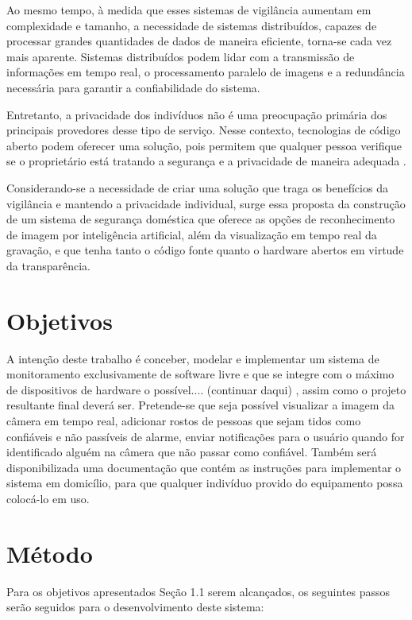 \documentclass[12pt, %
openright, 
oneside, %
a4paper,    %
brazil]{facom-ufu-abntex2}
\begin{document}
Ao mesmo tempo, à medida que esses sistemas de vigilância aumentam em
complexidade e tamanho, a necessidade de sistemas distribuídos, capazes de
processar grandes quantidades de dados de maneira eficiente, torna-se cada vez
mais aparente. Sistemas distribuídos podem lidar com a transmissão de
informações em tempo real, o processamento paralelo de imagens e a redundância
necessária para garantir a confiabilidade do sistema.

Entretanto, a privacidade dos indivíduos não é uma preocupação primária dos
principais provedores desse tipo de serviço. Nesse contexto, tecnologias de
código aberto podem oferecer uma solução, pois permitem que qualquer pessoa
verifique se o proprietário está tratando a segurança e a privacidade de
maneira adequada \cite{mardjan2016open}.

Considerando-se a necessidade de criar uma solução que traga os benefícios da
vigilância e mantendo a privacidade individual, surge essa proposta da
construção de um sistema de segurança doméstica que oferece as opções de
reconhecimento de imagem por inteligência artificial, além da visualização em
tempo real da gravação, e que tenha tanto o código fonte quanto o hardware
abertos em virtude da transparência.

\section{Objetivos}

A intenção deste trabalho é conceber, modelar e implementar um sistema de
monitoramento exclusivamente de software livre e que se integre com o máximo de
dispositivos de hardware o possível.... (continuar daqui) , assim como o
projeto resultante final deverá ser. Pretende-se que seja possível visualizar a
imagem da câmera em tempo real, adicionar rostos de pessoas que sejam tidos
como confiáveis e não passíveis de alarme, enviar notificações para o usuário
quando for identificado alguém na câmera que não passar como confiável. Também
será disponibilizada uma documentação que contém as instruções para implementar
o sistema em domicílio, para que qualquer indivíduo provido do equipamento
possa colocá-lo em uso.

\section{Método}

Para os objetivos apresentados Seção 1.1 serem alcançados, os seguintes passos
serão seguidos para o desenvolvimento deste sistema:
\end{document}
